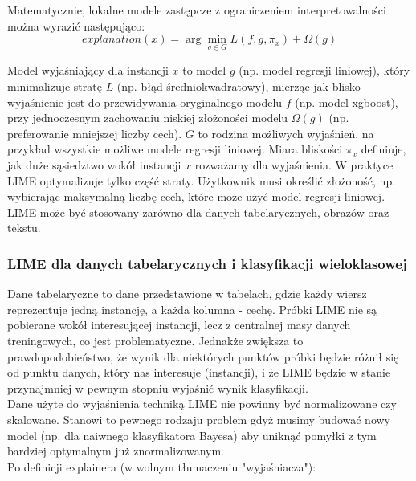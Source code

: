Matematycznie, lokalne modele zastępcze z ograniczeniem interpretowalności można wyrazić następująco:\\

\begin{equation}
    {explanation}(x) = \arg\min_{g \in G} L(f, g, \pi_x) + \Omega(g)
\end{equation}

Model wyjaśniający dla instancji \( x \) to model \( g \) (np. model regresji liniowej), który minimalizuje stratę \( L \) (np. błąd średniokwadratowy), mierząc jak blisko wyjaśnienie jest do przewidywania oryginalnego modelu \( f \) (np. model xgboost), przy jednoczesnym zachowaniu niskiej złożoności modelu \( \Omega(g) \) (np. preferowanie mniejszej liczby cech). \( G \) to rodzina możliwych wyjaśnień, na przykład wszystkie możliwe modele regresji liniowej. Miara bliskości \( \pi_x \) definiuje, jak duże sąsiedztwo wokół instancji \( x \) rozważamy dla wyjaśnienia. W praktyce LIME optymalizuje tylko część straty. Użytkownik musi określić złożoność, np. wybierając maksymalną liczbę cech, które może użyć model regresji liniowej. \cite{lime}\\

LIME może być stosowany zarówno dla danych tabelarycznych, obrazów oraz tekstu.\\

\subsubsection{LIME dla danych tabelarycznych i klasyfikacji wieloklasowej}

Dane tabelaryczne to dane przedstawione w tabelach, gdzie każdy wiersz reprezentuje jedną instancję, a każda kolumna - cechę. Próbki LIME nie są pobierane wokół interesującej instancji, lecz z centralnej masy danych treningowych, co jest problematyczne. Jednakże zwiększa to prawdopodobieństwo, że wynik dla niektórych punktów próbki będzie różnił się od punktu danych, który nas interesuje (instancji), i że LIME będzie w stanie przynajmniej w pewnym stopniu wyjaśnić wynik klasyfikacji.\\

Dane użyte do wyjaśnienia techniką LIME nie powinny być normalizowane czy skalowane. Stanowi to pewnego rodzaju problem gdyż musimy budować nowy model (np. dla naiwnego klasyfikatora Bayesa) aby uniknąć pomyłki z tym bardziej optymalnym już znormalizowanym.\\

Po definicji explainera (w wolnym tłumaczeniu "wyjaśniacza"):

